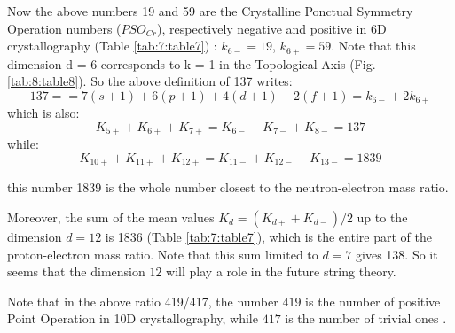 \documentclass[a4paper,9pt]{article}
\begin{document}
 Now the above numbers 19 and 59 are the Crystalline Ponctual Symmetry Operation numbers ($PSO_{Cr}$), respectively negative and positive in 6D crystallography \cite{Weigel} (Table \ref{tab:7:table7}) : $k_{6-} = 19$, $k_{6+} = 59$. Note that this dimension d = 6 corresponds to k = 1 in the Topological Axis (Fig. \ref{tab:8:table8}). So the above definition of 137 writes:
  \begin{equation}
   137 =   = 7(s +1) + 6(p +1) + 4(d +1) + 2(f +1) = k_{6-} + 2k_{6+}   
    \end{equation}
    which is also:
    \begin{equation}
    K_{5+}+K_{6+}+K_{7+} = K_{6-} + K_{7-} +K_{8-} = 137   
    \end{equation}
    while:
    \begin{equation}
    K_{10+} +K_{11+}+K_{12+} = K_{11-} +K_{12-}+K_{13-} = 1839   
    \end{equation}
    
    this number 1839 is the whole number closest to the neutron-electron mass ratio.


    
    Moreover, the sum of the mean values $K_{d} = (K_{d+} + K_{d-})/2$ up to the dimension $d = 12$ is 1836 (Table \ref{tab:7:table7}), which is the entire part of the proton-electron mass ratio. Note that this sum limited to $d = 7$ gives 138. So it seems that the dimension $12$ will play a role in the future string theory.
    
    
    Note that in the  above ratio 419/417, the number $419$ is the number of positive Point Operation in 10D crystallography, while $417$ is the number of trivial ones .
\end{document}
